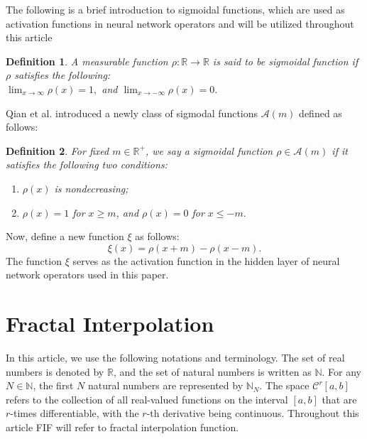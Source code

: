 \documentclass{article}[12pt, a4]
\newtheorem{definition}{\large Definition}[section]
\begin{document}
The following is a brief introduction to sigmoidal functions, which are used as activation functions in neural network operators and will be utilized throughout this article

\begin{definition}
	A measurable function $\rho :\mathbb{R}\rightarrow \mathbb{R}$ is said to be sigmoidal  function if $\rho$ satisfies the following:\\
	
	$\displaystyle\lim_{x\rightarrow \infty}\rho(x)=1,$ and $\displaystyle\lim_{x\rightarrow -\infty}\rho(x)=0.$ 
\end{definition}

\noindent Qian et al. \cite{QIAN2022126781} introduced a newly class of sigmodal functions $\mathcal{A}(m)$ defined as follows:\\

\begin{definition}\label{sig}
	For fixed $m\in \mathbb{R}^+$, we say a sigmoidal function $\rho \in \mathcal{A}(m)$ if it satisfies the following two conditions:\\
	\begin{enumerate}
		\item[(i)] $\rho(x)$ is nondecreasing;
		\item[(ii)] $\rho(x)=1$ for $x\geq m$, and $\rho(x)=0$ for $x\leq -m.$
	\end{enumerate}
\end{definition}

Now, define a new function $\xi$ as follows:
\begin{equation}\label{xi}
	\xi(x)=\rho(x+m)-\rho(x-m).
\end{equation}
The function $\xi$ serves as the activation function in the hidden layer of neural network operators used in this paper.




\section{Fractal Interpolation}\label{sec2}
In this article, we use the following notations and terminology. The set of real numbers is denoted by $\mathbb{R}$, and the set of natural numbers is written as $\mathbb{N}$. For any $N \in \mathbb{N}$, the first $N$ natural numbers are represented by $\mathbb{N}_N$. The space $\mathcal{C}^{r}[a, b]$ refers to the collection of all real-valued functions on the interval $[a, b]$ that are $r$-times differentiable, with the $r$-th derivative being continuous. Throughout this article FIF will refer to fractal interpolation function.
	
\end{document}
